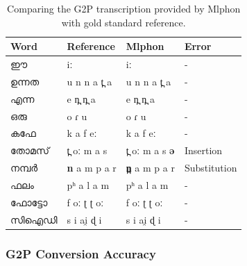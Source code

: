 \begin{table}[htpb]
	\begin{center}
		\caption{Comparing the G2P transcription provided by  Mlphon with gold standard reference.}
		\label{tab:gold}
		\begin{tabular}{llll}
			\hline\hline
			Word        & Reference                   & Mlphon                                & Error        \\
			\hline
			{\mal ഈ}    & {\ipa iː}                   & {\ipa iː}                             & -            \\
			{\mal ഉന്നത} & {\ipa u n n a t̪ a}          & {\ipa u n n a t̪ a}                    & -            \\
			{\mal  എന്ന} & {\ipa e n̪ n̪ a }             & {\ipa e n̪ n̪ a}                        & -            \\
			{\mal  ഒരു}  & {\ipa o ɾ u }               & {\ipa o ɾ u}                          & -            \\
			{\mal കഫേ}   & {\ipa k a f eː}             & {\ipa k a f eː}                       & -            \\
			{\mal തോമസ്}  & {\ipa t̪ oː m a s}           & {\ipa t̪ oː m a s} \textbf{{\ipa  ə}}  & Insertion    \\
			{\mal നമ്പർ} & {\ipa \textbf{n} a m p a r} & \textbf{{\ipa n̪  }} {\ipa  a m p a r} & Substitution \\
			{\mal ഫലം}   & {\ipa  pʰ a l a m}          & {\ipa pʰ a l a m}                     & -            \\
			{\mal ഫോട്ടോ}  & {\ipa f oː ʈ ʈ oː}          & {\ipa f oː ʈ ʈ oː}                    & -            \\
			{\mal സിഐഡി}  & {\ipa s i ai̯ ɖ i }          & {\ipa s i ai̯ ɖ i }                    & -            \\
			\hline
		\end{tabular}
	\end{center}
\end{table}

\subsubsection{G2P Conversion Accuracy}

